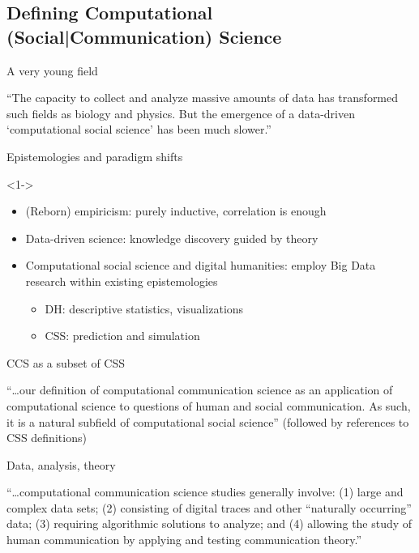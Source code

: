 \documentclass[handout]{beamer}
\begin{document}
\subsection{Defining Computational (Social|Communication) Science}


\begin{frame}{A very young field}
	\begin{block}{\textcite{Lazer2009}}
		``The capacity to collect and analyze massive amounts of data has transformed such fields as biology and physics. But the emergence of a data-driven `computational social science' has been much slower.''
	\end{block}
\end{frame}


\begin{frame}{Epistemologies and paradigm shifts}
	\begin{block}{\textcite{Kitchin2014}}<1->
		\begin{itemize}
			\item<2-> (Reborn) empiricism: purely inductive, correlation is enough
			\item<3-> Data-driven science: knowledge discovery guided by theory
			\item<4-> Computational social science and digital humanities: employ Big Data research within existing epistemologies
			\begin{itemize}
				\item DH: descriptive statistics, visualizations
				\item CSS: prediction and simulation
			\end{itemize}
		\end{itemize}
	\end{block}
\end{frame}



\begin{frame}{CCS as a subset of CSS}
	\begin{block}{\textcite{Hilbert2019}}
		``\ldots our definition of computational communication science as an application of computational science to questions of human and social communication. As such, it is a natural subfield of computational social science'' (followed by references to CSS definitions)
	\end{block}
\end{frame}



\begin{frame}{Data, analysis, theory}
	\begin{block}{\textcite{VanAtteveldt2018a}}
		``\ldots computational communication science studies generally involve: (1) large and complex data sets; (2) consisting of digital traces and other ``naturally occurring'' data; (3) requiring algorithmic solutions to analyze; and (4) allowing the study of human communication by applying and testing communication theory.''
	\end{block}	
	
\end{frame}
\end{document}
